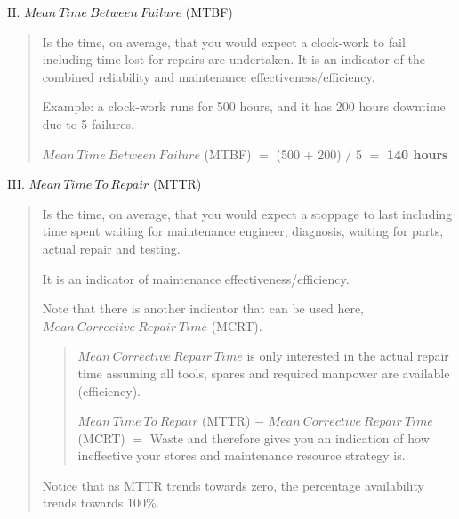 II. $Mean~Time~Between~Failure$ (MTBF) 

\begin{quote}
Is the time, on average, that you would expect a clock-work to fail including time lost for repairs are undertaken. It is an indicator of the combined reliability and maintenance effectiveness/efficiency.

Example: a clock-work runs for 500 hours, and it has 200 hours downtime due to 5 failures.

$Mean~Time~Between~Failure$ (MTBF) $=$ (500 $+$ 200) $/$ 5 $=$ \textbf{140 hours}                               \end{quote} 

III. $Mean~Time~To~Repair$ (MTTR) 

\begin{quote}
Is the time, on average, that you would expect a stoppage to last including time spent waiting for maintenance engineer, diagnosis, waiting for parts, actual repair and testing. 

It is an indicator of maintenance effectiveness/efficiency. 

Note that there is another indicator that can be used here, $Mean~Corrective~Repair~Time$ (MCRT). 
\begin{quote}
$Mean~Corrective~Repair~Time$ is only interested in the actual repair time assuming all tools, spares and required manpower are available (efficiency).

$Mean~Time~To~Repair$ (MTTR) $-$  $Mean~Corrective~Repair~Time$ (MCRT)  $=$  Waste and therefore gives you an indication of how ineffective your stores and maintenance resource strategy is.                                                                                                                                                                                                                                                                                                                                                                                                                                                                                                                                                                                                        \end{quote} 

Notice that as MTTR trends towards zero, the percentage availability trends towards 100\%.

\end{quote}


